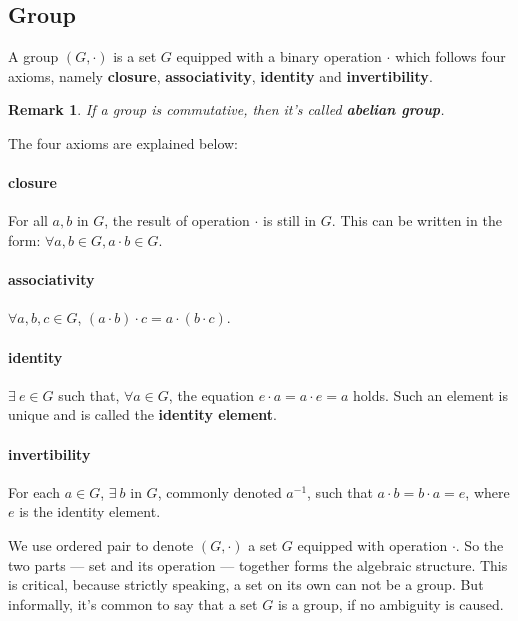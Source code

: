 \documentclass[UTF8]{ctexart}
\theoremstyle{mystyle}
\theoremstyle{myremark}
\newtheorem*{remark}{Remark}
\theoremstyle{plain}
\begin{document}
\subsection{Group}
\begin{definition}
    A group $ (G, \cdot) $ is a set $ G $ equipped with a binary operation $ \cdot $ which follows four axioms, namely \textbf{closure}, \textbf{associativity}, \textbf{identity} and \textbf{invertibility}.
\end{definition}    

\begin{remark}
    If a group is commutative, then it's called \textbf{abelian group}.
\end{remark}

The four axioms are explained below:
\paragraph{closure}
For all $ a, b $ in $ G $, the result of operation $ \cdot $ is still in $ G $. This can be written in the form: $ \forall a, b \in G, a \cdot b \in G $.

\paragraph{associativity}
$ \forall a, b, c \in G $, $ (a \cdot b) \cdot c = a \cdot (b \cdot c) $.

\paragraph{identity}
$ \exists\ e \in G $ such that, $ \forall a \in G $, the equation $ e \cdot a = a \cdot e = a $ holds. Such an element is unique and is called the \textbf{identity element}.

\paragraph{invertibility}
For each $ a \in G $, $ \exists\ b $ in $ G $, commonly denoted $ a^{-1} $, such that $ a \cdot b = b \cdot a = e $, where $ e $ is the identity element.

We use ordered pair to denote $ (G, \cdot) $ a set $ G $ equipped with operation $ \cdot $. So the two parts --- set and its operation --- together forms the algebraic structure. This is critical, because strictly speaking, a set on its own can not be a group. But informally, it's common to say that a set $ G $ is a group, if no ambiguity is caused.
\end{document}

